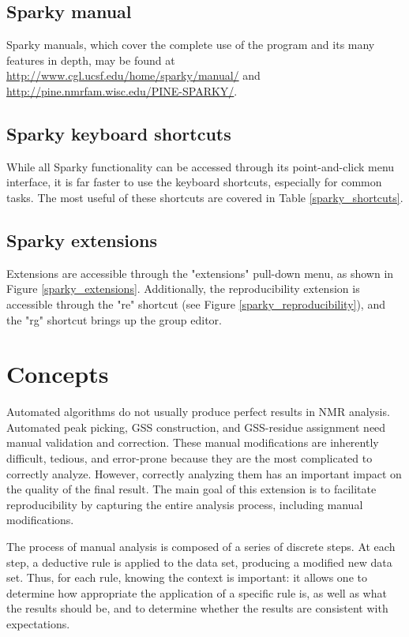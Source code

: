 \subsection{Sparky manual}
Sparky manuals, which cover the complete use of the program and its many
features in depth, may be found at 
\url{http://www.cgl.ucsf.edu/home/sparky/manual/} and 
\url{http://pine.nmrfam.wisc.edu/PINE-SPARKY/}.

\subsection{Sparky keyboard shortcuts}
While all Sparky functionality can be accessed through its point-and-click
menu interface, it is far faster to use the keyboard shortcuts, especially
for common tasks.  The most useful of these shortcuts are covered in Table
\ref{sparky_shortcuts}.

\subsection{Sparky extensions}
Extensions are accessible through the "extensions" pull-down menu,
as shown in Figure \ref{sparky_extensions}.
Additionally, the reproducibility extension is accessible through
the "re" shortcut (see Figure \ref{sparky_reproducibility}),
and the "rg" shortcut brings up the group editor.



\section{Concepts}
Automated algorithms do not usually produce perfect results in NMR analysis.
Automated peak picking,
GSS construction, and GSS-residue assignment need manual validation and
correction.  These manual modifications are inherently difficult, tedious,
and error-prone because they are the most complicated to correctly analyze.
However, correctly analyzing them has an important impact on the quality
of the final result.
The main goal of this extension is to facilitate reproducibility
by capturing the entire analysis process, including manual modifications.

The process of manual analysis is composed of a series of discrete steps.
At each step, a deductive rule is applied to the data set, producing a
modified new data set.  Thus, for each rule, knowing the context is important:
it allows one to determine how appropriate the application of a specific rule
is, as well as what the results should be, and to determine whether the 
results are consistent with expectations.

